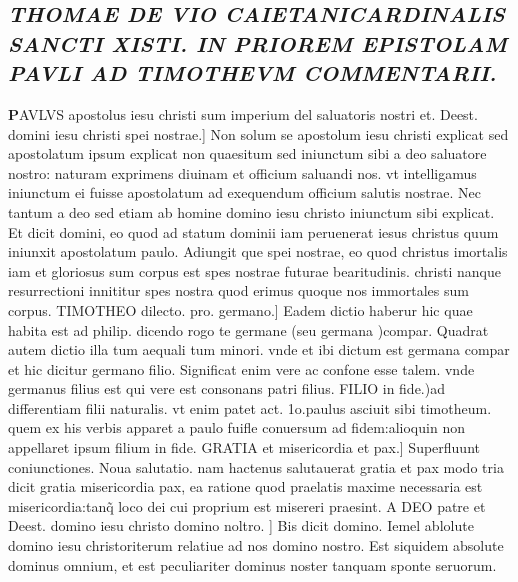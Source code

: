 \documentclass{article}
\begin{document}
\begin{pages}
\subsection*{\textit{THOMAE DE VIO CAIETANICARDINALIS SANCTI XISTI. IN PRIOREM EPISTOLAM PAVLI AD TIMOTHEVM COMMENTARII. }}\pstart \huge\textbf{P}\normalsize AVLVS apostolus iesu christi sum imperium del saluatoris nostri et. Deest. domini iesu christi spei nostrae.] Non solum se apostolum iesu christi explicat sed apostolatum ipsum explicat non quaesitum sed iniunctum sibi a deo saluatore nostro: naturam exprimens diuinam et officium saluandi nos. vt intelligamus iniunctum ei fuisse apostolatum ad exequendum officium salutis nostrae. Nec tantum a deo sed etiam ab homine domino iesu christo iniunctum sibi explicat. Et dicit domini, eo quod ad statum dominii iam peruenerat iesus christus quum iniunxit apostolatum paulo. Adiungit que spei nostrae, eo quod christus imortalis iam et gloriosus sum corpus est spes nostrae futurae bearitudinis. christi nanque resurrectioni innititur spes nostra quod erimus quoque nos immortales sum corpus. TIMOTHEO dilecto. pro. germano.] Eadem dictio haberur hic quae habita est ad philip. dicendo rogo te germane (seu germana )compar. Quadrat autem dictio illa tum aequali tum minori. vnde et ibi dictum est germana compar et hic dicitur germano filio. Significat enim vere ac confone esse talem. vnde germanus filius est qui vere est consonans patri filius. FILIO in fide.)ad differentiam filii naturalis. vt enim patet act. 1o.paulus asciuit sibi timotheum. quem ex his verbis apparet a paulo fuifle conuersum ad fidem:alioquin non appellaret ipsum filium in fide. GRATIA et misericordia et pax.] Superfluunt coniunctiones. Noua salutatio. nam hactenus salutauerat gratia et pax modo tria dicit gratia misericordia pax, ea ratione quod praelatis maxime necessaria est misericordia:tanq̃ loco dei cui proprium est misereri praesint. A DEO patre et Deest. domino iesu christo domino noltro. ] Bis dicit domino. Iemel ablolute domino iesu christoriterum relatiue ad nos domino nostro. Est siquidem absolute dominus omnium, et est peculiariter dominus noster tanquam sponte seruorum.  \pend

\end{pages}
\end{document}
